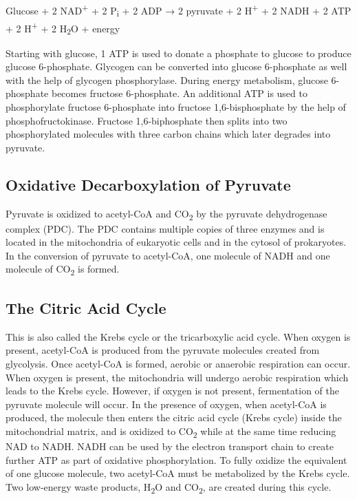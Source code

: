 Glucose + 2 NAD\textsuperscript{+} + 2 P\textsubscript{i} + 2 ADP → 2 pyruvate + 2 H\textsuperscript{+} + 2 NADH + 2 ATP + 2 H\textsuperscript{+} + 2 H\textsubscript{2}O + energy

Starting with glucose, 1 ATP is used to donate a phosphate to glucose to produce glucose 6-phosphate. Glycogen can be converted into glucose 6-phosphate as well with the help of glycogen phosphorylase. During energy metabolism, glucose 6-phosphate becomes fructose 6-phosphate. An additional ATP is used to phosphorylate fructose 6-phosphate into fructose 1,6-bisphosphate by the help of phosphofructokinase. Fructose 1,6-biphosphate then splits into two phosphorylated molecules with three carbon chains which later degrades into pyruvate.

\hypertarget{oxidative-decarboxylation-of-pyruvate}{%
\subsection{Oxidative Decarboxylation of Pyruvate}\label{oxidative-decarboxylation-of-pyruvate}}

Pyruvate is oxidized to acetyl-CoA and CO\textsubscript{2} by the pyruvate dehydrogenase complex (PDC). The PDC contains multiple copies of three enzymes and is located in the mitochondria of eukaryotic cells and in the cytosol of prokaryotes. In the conversion of pyruvate to acetyl-CoA, one molecule of NADH and one molecule of CO\textsubscript{2} is formed.

\hypertarget{the-citric-acid-cycle}{%
\subsection{The Citric Acid Cycle}\label{the-citric-acid-cycle}}

This is also called the Krebs cycle or the tricarboxylic acid cycle. When oxygen is present, acetyl-CoA is produced from the pyruvate molecules created from glycolysis. Once acetyl-CoA is formed, aerobic or anaerobic respiration can occur. When oxygen is present, the mitochondria will undergo aerobic respiration which leads to the Krebs cycle. However, if oxygen is not present, fermentation of the pyruvate molecule will occur. In the presence of oxygen, when acetyl-CoA is produced, the molecule then enters the citric acid cycle (Krebs cycle) inside the mitochondrial matrix, and is oxidized to CO\textsubscript{2} while at the same time reducing NAD to NADH. NADH can be used by the electron transport chain to create further ATP as part of oxidative phosphorylation. To fully oxidize the equivalent of one glucose molecule, two acetyl-CoA must be metabolized by the Krebs cycle. Two low-energy waste products, H\textsubscript{2}O and CO\textsubscript{2}, are created during this cycle.

